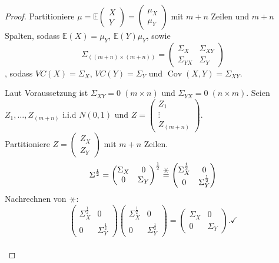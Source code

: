 \documentclass{tstextbook}
\begin{document}
\begin{proof}
	
	Partitioniere $ \mu = \mathbb{E} \begin{pmatrix} X \\ Y \end{pmatrix} =  \begin{pmatrix} \mu_X \\ \mu_Y \end{pmatrix}$ mit $ m+n $ Zeilen und $ m+n $ Spalten, sodass
	$  \mathbb{E}(X)=\mu_Y $,
	$ \mathbb{E}(Y) \mu_Y $, sowie
	\[ \Sigma_{((m+n)\times (m+n))} = \begin{pmatrix}
			\Sigma_X & \Sigma_{XY} \\ \Sigma_{YX} & \Sigma_Y
		\end{pmatrix} \], sodass 
	$ VC(X)=\Sigma_X $, $VC(Y)=\Sigma_Y $ und $ \operatorname{Cov}(X,Y) = \Sigma_{XY}. $
	
	Laut Voraussetzung ist $ \Sigma_{XY} = 0 \; (m \times n) $  und $ \Sigma_{YX} = 0 \; (n \times m). $
	Seien $ Z_1,\ldots , Z_{(m+n)} $  i.i.d $ N(0,1) $ und $ Z= \begin{pmatrix}
		 Z_1 \\ \vdots \\ Z_{(m+n)}
	\end{pmatrix} .$ \\
	Partitioniere $ Z =  \begin{pmatrix} Z_X \\ Z_Y \end{pmatrix} $  mit $ m+n $ Zeilen.
	\[ \Sigma^{\frac{1}{2}} = \begin{pmatrix}
		\Sigma_X & 0 \\
		0 & \Sigma_Y
	\end{pmatrix}^{\frac{1}{2}} 
	\stackrel{\hexstar}{=}
	 \begin{pmatrix}
	\Sigma_X^{\frac{1}{2}} & 0 \\
	0 & \Sigma_Y^{\frac{1}{2}}
	\end{pmatrix} \]
Nachrechnen von $ \hexstar $:
	\[ \begin{pmatrix}
		\Sigma_X^{\frac{1}{2}} & 0 \\
		0 & \Sigma_Y^{\frac{1}{2}}
	\end{pmatrix}
	\begin{pmatrix}
		\Sigma_X^{\frac{1}{2}} & 0 \\
		0 & \Sigma_Y^{\frac{1}{2}}
	\end{pmatrix}
	=
	\begin{pmatrix}
		\Sigma_X & 0 \\
		0 & \Sigma_Y
	\end{pmatrix}. \checkmark \] \\


\end{proof}
\end{document}
